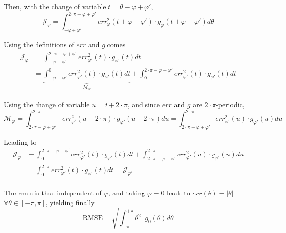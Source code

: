 Then, with the change of variable $t = \theta - \varphi + \varphi'$,
\begin{equation}
	\mathcal{J_\varphi} = \int_{-\varphi + \varphi'}^{2 \cdot \pi-\varphi + \varphi'} err_\varphi^2(t + \varphi - \varphi') \cdot g_\varphi(t + \varphi - \varphi') d\theta
\end{equation}

Using the definitions of $err$ and $g$ comes
\begin{equation}
	\begin{aligned}
		\mathcal{J_\varphi} &= \int_{-\varphi + \varphi'}^{2 \cdot \pi -\varphi + \varphi'} err_{\varphi'}^2(t) \cdot g_{\varphi'}(t) dt\\
		&= \underbrace{\int_{-\varphi + \varphi'}^{0} err_{\varphi'}^2(t) \cdot g_{\varphi'}(t) dt}_{\mathcal{M_\varphi}} + \int_{0}^{2 \cdot \pi-\varphi + \varphi'} err_{\varphi'}^2(t) \cdot g_{\varphi'}(t) dt
	\end{aligned}
\end{equation}

Using the change of variable $u = t + 2\cdot \pi$, and since $err$ and $g$ are $2\cdot\pi$-periodic,
\begin{equation}
	\mathcal{M_\varphi} = \int_{2 \cdot \pi-\varphi + \varphi'}^{2 \cdot \pi} err_{\varphi'}^2(u - 2\cdot \pi) \cdot g_{\varphi'}(u - 2\cdot \pi) du = \int_{2 \cdot \pi-\varphi + \varphi'}^{2 \cdot \pi} err_{\varphi'}^2(u) \cdot g_{\varphi'}(u) du
\end{equation}

Leading to
\begin{equation}
	\begin{aligned}
		\mathcal{J_\varphi} &= \int_{0}^{2 \cdot \pi-\varphi + \varphi'} err_{\varphi'}^2(t) \cdot g_{\varphi'}(t) dt + \int_{2 \cdot \pi-\varphi + \varphi'}^{2 \cdot \pi} err_{\varphi'}^2(u) \cdot g_{\varphi'}(u) du\\
		&= \int_{0}^{2 \cdot \pi} err_{\varphi'}^2(t) \cdot g_{\varphi'}(t) dt = \mathcal{J_{\varphi'}}\\
	\end{aligned}
\end{equation}

The \gls{rmse} is thus independent of $\varphi$, and taking $\varphi=0$ leads to $err(\theta) = |\theta|$ $\forall \theta \in \left[-\pi, \pi\right]$, yielding finally
\begin{equation}\label{eq:choos:apsipa:rmse_polar}
	\boxed{
		\text{RMSE} = \sqrt{\int_{-\pi}^{+\pi} \theta^2 \cdot g_0(\theta) d\theta}
	}
\end{equation}

